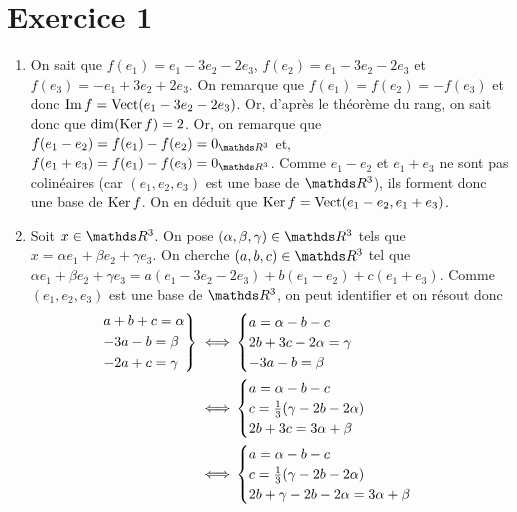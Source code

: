\section{Exercice 1}

\begin{enumerate}
	\item On sait que $f(e_1) = e_1 - 3e_2 - 2e_3$, $f(e_2) = e_1 - 3e_2 - 2e_3$\/ et $f(e_3) = -e_1 + 3e_2 + 2e_3$. On remarque que $f(e_1) = f(e_2) = -f(e_3)$\/ et donc $\operatorname{Im} f = \operatorname{Vect}(e_1-3e_2-2e_3)$. Or, d'après le théorème du rang, on sait donc que $\dim(\operatorname{Ker} f) = 2$. Or, on remarque que $f(e_1 - e_2) = f(e_1) - f(e_2) = 0_{\R^3}$\/ et, $f(e_1 + e_3) = f(e_1) - f(e_3) = 0_{\R^3}$. Comme $e_1-e_2$\/ et $e_1+e_3$\/ ne sont pas colinéaires (car $(e_1,e_2,e_3)$\/ est une base de $\R^3$), ils forment donc une base de $\operatorname{Ker} f$. On en déduit que $\operatorname{Ker} f = \operatorname{Vect}(e_1-e_2,e_1+e_3)$.
	\item Soit $x \in \R^3$. On pose $(\alpha,\beta,\gamma) \in \R^3$\/ tels que $x = \alpha e_1 + \beta e_2 + \gamma e_3$. On cherche $(a,b,c) \in \R^3$\/ tel que $\alpha e_1 + \beta e_2 + \gamma e_3 = a(e_1 - 3e_2 - 2e_3) + b(e_1 - e_2) + c(e_1+e_3)$. Comme $(e_1,e_2,e_3)$\/ est une base de $\R^3$, on peut identifier et on résout donc
		\begin{align*}
			\begin{rcases*}
				a + b + c = \alpha\\
				-3a - b = \beta\\
				-2a + c = \gamma
			\end{rcases*} \iff& \begin{cases}
				a = \alpha - b - c\\
				2b + 3c -2\alpha = \gamma\\
				-3a - b = \beta
			\end{cases}\\
			\iff& \begin{cases}
				a = \alpha - b - c\\
				c = \frac{1}{3}(\gamma - 2b - 2\alpha)\\
				2b + 3c = 3\alpha + \beta\\
			\end{cases}\\
			\iff& \begin{cases}
				a = \alpha - b - c\\
				c = \frac{1}{3}(\gamma - 2b - 2\alpha)\\
				2b + \gamma - 2b - 2\alpha = 3\alpha + \beta
			\end{cases}\\

\end{align*}
\end{enumerate}
